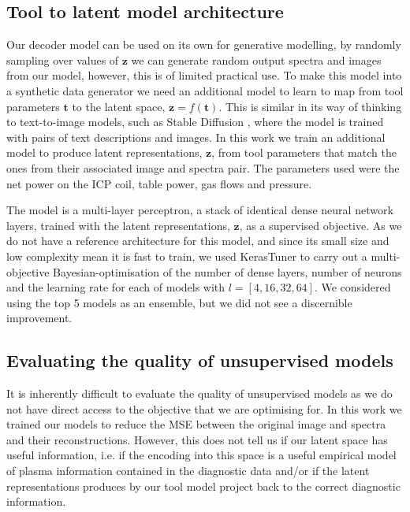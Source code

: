 \documentclass[10pt]{iopart}
\newcommand{\jfnote}[2][\textcolor{black}{\dagger}]{$#1$\marginpar{\color{red}\raggedright\tiny$#1$ #2}}
\begin{document}



\subsection{Tool to latent model architecture}

Our decoder model can be used on its own for generative modelling, by randomly sampling over values of $\mathbf{z}$ we can generate random output spectra and images from our model, however, this is of limited practical use. To make this model into a synthetic data generator we need an additional model to learn to map from tool parameters $\textbf{t}$ to the latent space, $\textbf{z} = f(\textbf{t})$. This is similar in its way of thinking to text-to-image models, such as Stable Diffusion \cite{rombachHighResolutionImageSynthesis2022}, where the model is trained with pairs of text descriptions and images. In this work we train an additional model to produce latent representations, $\mathbf{z}$, from tool parameters that match the ones from their associated image and spectra pair. The parameters used were the net power on the ICP coil, table power, gas flows and pressure.

The model is a multi-layer perceptron, a stack of identical dense neural network layers, trained with the latent representations, $\mathbf{z}$, as a supervised objective. As we do not have a reference architecture for this model, and since its small size and low complexity mean it is fast to train, we used KerasTuner \cite{omalleyKerasTuner2019} to carry out a multi-objective Bayesian-optimisation of the number of dense layers, number of neurons and the learning rate for each of models with $l = [4,16,32,64]$. We considered using the top 5 models as an ensemble, but we did not see a discernible improvement. 


\subsection{Evaluating the quality of unsupervised models}

It is inherently difficult to evaluate the quality of unsupervised models as we do not have direct access to the objective that we are optimising for. In this work we trained our models to reduce the MSE between the original image and spectra and their reconstructions. However, this does not tell us if our latent space has useful information, i.e. if the encoding into this space is a useful empirical model of plasma information contained in the diagnostic data and/or if the latent representations produces by our tool model project back to the correct diagnostic information.
\end{document}
